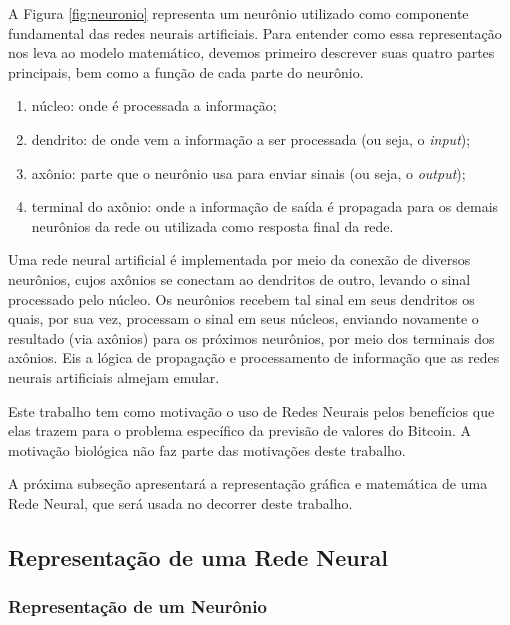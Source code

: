 A Figura \ref{fig:neuronio} representa um neurônio utilizado como componente fundamental das redes neurais artificiais. Para entender como essa representação nos leva ao modelo matemático, devemos primeiro descrever suas quatro partes principais, bem como a função de cada parte do neurônio.

\begin{enumerate}
    \item núcleo: onde é processada a informação;
    \item dendrito: de onde vem a informação a ser processada (ou seja, o \textit{input});
    \item axônio: parte que o neurônio usa para enviar sinais (ou seja, o \textit{output});
    \item terminal do axônio: onde a informação de saída é propagada para os demais neurônios da rede ou utilizada como resposta final da rede.
\end{enumerate}

Uma rede neural artificial é implementada por meio da conexão de diversos neurônios, cujos axônios se conectam ao dendritos de outro, levando o sinal processado pelo núcleo. Os neurônios recebem tal sinal em seus dendritos os quais, por sua vez, processam o sinal em seus núcleos, enviando novamente o resultado (via axônios) para os próximos neurônios, por meio dos terminais dos axônios. Eis a lógica de propagação e processamento de informação que as redes neurais artificiais almejam emular.

Este trabalho tem como motivação o uso de Redes Neurais pelos benefícios que elas trazem para o problema específico da previsão de valores do Bitcoin. A motivação biológica não faz parte das motivações deste trabalho.

A próxima subseção apresentará a representação gráfica e matemática de uma Rede Neural, que será usada no decorrer deste trabalho.

\subsection{Representação de uma Rede Neural}

\subsubsection{Representação de um Neurônio}
\label{subsubsec:representacaoumneuronio}

